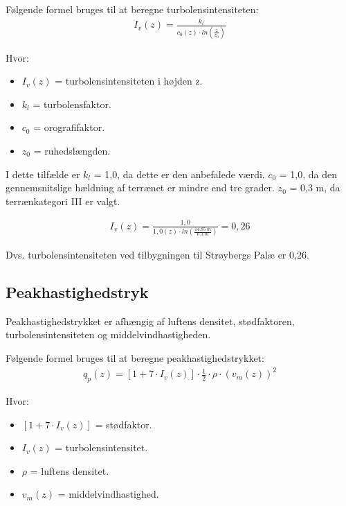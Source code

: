 Følgende formel bruges til at beregne turbolensintensiteten:
\begin{align*}
I_{v}(z) = \frac{k_{l}}{c_{0}(z) \cdot ln\left(\frac{z}{z_{0}}\right)}
\end{align*}

Hvor:
\begin{itemize}
\item $ I_{v}(z) $ = turbolensintensiteten i højden z.
\item $ k_{l} $ = turbolensfaktor.
\item $ c_{0} $ = orografifaktor.
\item $ z_{0} $ = ruhedslængden.
\end{itemize}

I dette tilfælde er $ k_{l} $ = 1,0, da dette er den anbefalede værdi. $ c_{0} $ = 1,0, da den gennemsnitslige hældning af terrænet er mindre end tre grader. $ z_{0} $ = 0,3 m, da terrænkategori III er valgt.

\begin{align*}
I_{v}(z) = \frac{1,0}{1,0(z) \cdot ln\left(\frac{\SI{14,85}{m}}{\SI{0,3}{m}}\right)} = 0,26
\end{align*}

Dvs. turbolensintensiteten ved tilbygningen til Strøybergs Palæ er 0,26.







\subsection{Peakhastighedstryk}
Peakhastighedstrykket er afhængig af luftens densitet, stødfaktoren, turbolensintensiteten og middelvindhastigheden.

Følgende formel bruges til at beregne peakhastighedstrykket:
\begin{align*}
q_{p}(z) = [1 + 7 \cdot I_{v}(z)] \cdot \frac{1}{2} \cdot \rho \cdot (v_{m}(z))^2
\end{align*}

Hvor:
\begin{itemize}
\item $ [1 + 7 \cdot I_{v}(z)] $ = stødfaktor.
\item $ I_{v}(z) $ = turbolensintensitet.
\item $ \rho $ = luftens densitet.
\item $ v_{m}(z) $ = middelvindhastighed.
\end{itemize}

